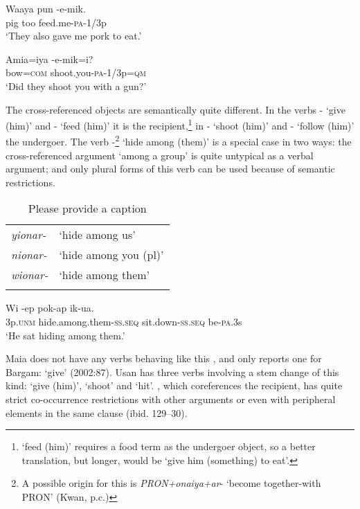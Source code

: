 \ea%
\label{ex:3:x335}
\gll Waaya pun -e-mik. \\
pig too feed.me-\textsc{pa}-1/3p \\
\glt`They also gave me pork to eat.'
\z

\ea%
\label{ex:3:x336}
\gll Amia=iya -e-mik=i? \\
bow=\textsc{com} shoot.you-\textsc{pa}-1/3p=\textsc{qm}\\
\glt`Did they shoot you with a gun?'
\z

The cross-referenced objects are semantically quite different. In the verbs - `give (him)' and - `feed (him)' it is the recipient,\footnote{ `feed (him)' requires a food term as the undergoer object, so a better translation, but longer, would be `give him (something) to eat'.} in - `shoot (him)' and - `follow (him)' the undergoer. The verb -\footnote{A possible origin for this is \textit{\textsc{PRON}+onaiya+ar}- `become together-with \textsc{PRON}' (Kwan, p.c.)} `hide among (them)' is a special case in two ways: the cross-referenced argument `among a group' is quite untypical as a verbal argument; and only plural forms of this verb can be used because of semantic restrictions. 

\begin{table}
\caption{Please provide a caption}
\label{} 
\begin{tabular}{>{\itshape}ll}
\mytoprule
yionar- &`hide among us'\\
nionar- &`hide among you (pl)'\\
wionar- &`hide among them'\\
\mybottomrule
\end{tabular}

\end{table}

\ea%
\label{ex:3:x337}
\gll Wi -ep pok-ap ik-ua. \\
3p.\textsc{unm} hide.among.them-\textsc{ss}.\textsc{seq} sit.down-\textsc{ss}.\textsc{seq} be-\textsc{pa}.3s \\
\glt`He sat hiding among them.'
\z

Maia does not have any verbs behaving like this \citep{Hardin2002}, and \citeauthor{Hepner2002} only reports one for Bargam:  `give' (2002:87). Usan has three verbs involving a stem change of this kind:  `give (him)',  `shoot' and  `hit'\citep[44]{Reesink1987}. , which coreferences the recipient, has quite strict co-occurrence restrictions with other arguments or even with peripheral elements in the same clause (ibid. 129--30). 

